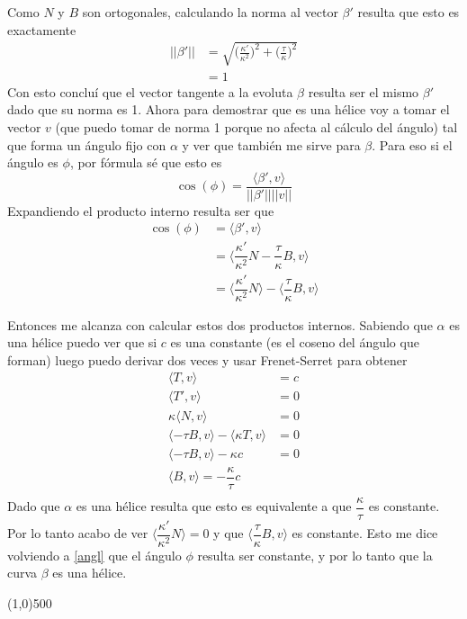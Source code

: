 \documentclass{article}
\begin{document}
\begin{itemize}
   Como $N$ y $B$ son ortogonales, calculando la norma al vector $\beta'$ resulta que esto es exactamente
   \begin{align*}
   ||\beta'||&=\sqrt{\bigg(\frac{\kappa'}{\kappa^2}\bigg)^2 + \bigg(\frac{\tau}{\kappa}\bigg)^2}\\
   &=1
   \end{align*}
   Con esto concluí que el vector tangente a la evoluta $\beta$ resulta ser el mismo $\beta'$ dado que su norma es 1. Ahora para demostrar que es una hélice voy a tomar el vector $v$ (que puedo tomar de norma 1 porque no afecta al cálculo del ángulo) tal que forma un ángulo fijo con $\alpha$ y ver que también me sirve para $\beta$. Para eso si el ángulo es $\phi$, por fórmula sé que esto es
   \[\cos(\phi) = \dfrac{\langle \beta', v \rangle}{||\beta'|| ||v||}\] 
   Expandiendo el producto interno resulta ser que 
   \begin{equation} \label{angl}
   \begin{aligned}
   \cos(\phi) &= \langle \beta', v \rangle \\
   &= \langle \dfrac{\kappa'}{\kappa^2}N - \dfrac{\tau}{\kappa}B , v \rangle \\
   &= \langle \dfrac{\kappa'}{\kappa^2}N \rangle - \langle  \dfrac{\tau}{\kappa}B , v \rangle
   \end{aligned}
   \end{equation}
   
   Entonces me alcanza con calcular estos dos productos internos. Sabiendo que $\alpha$ es una hélice puedo ver que si $c$ es una constante (es el coseno del ángulo que forman) luego puedo derivar dos veces y usar Frenet-Serret para obtener 
   \begin{align*}
   \langle T, v \rangle &= c \\
   \langle T', v \rangle &= 0 \\
   \kappa \langle N , v \rangle &= 0 \\
   \langle -\tau B, v \rangle - \langle \kappa T, v \rangle &= 0 \\
   \langle -\tau B, v \rangle -  \kappa c &= 0 \\
   \langle  B, v \rangle =  -\dfrac{\kappa}{\tau} c \\
   \end{align*}
   Dado que $\alpha$ es una hélice resulta que esto es equivalente a que $\dfrac{\kappa}{\tau}$ es constante. Por lo tanto acabo de ver $\langle \dfrac{\kappa'}{\kappa^2}N \rangle  = 0$ y que $\langle  \dfrac{\tau}{\kappa}B , v \rangle$ es constante. Esto me dice volviendo a \ref{angl} que el ángulo $\phi$ resulta ser constante, y por lo tanto que la curva $\beta$ es una hélice.
   
   \line(1,0){500}
   
   
   
\end{itemize}

 
\end{document}
